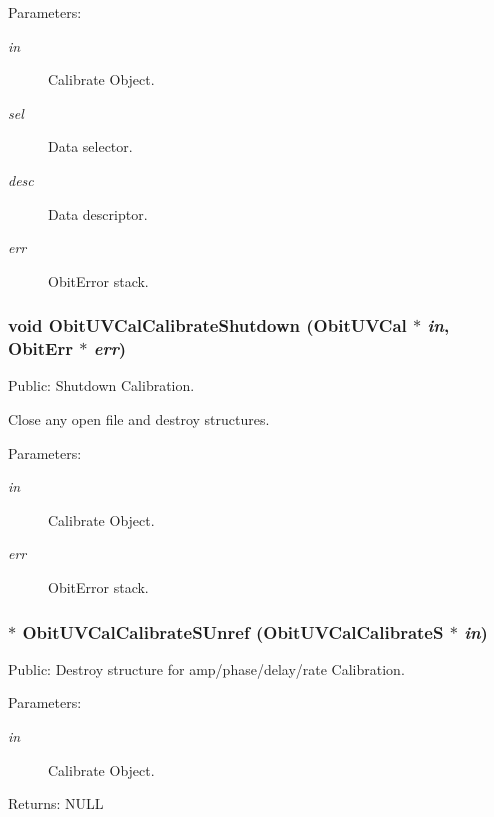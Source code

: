\begin{Desc}
\item[Parameters:]
\begin{description}
\item[{\em in}]Calibrate Object. \item[{\em sel}]Data selector. \item[{\em desc}]Data descriptor. \item[{\em err}]Obit\-Error stack. \end{description}
\end{Desc}
\subsubsection{\setlength{\rightskip}{0pt plus 5cm}void Obit\-UVCal\-Calibrate\-Shutdown ({\bf Obit\-UVCal} $\ast$ {\em in}, {\bf Obit\-Err} $\ast$ {\em err})}\label{ObitUVCalCalibrate_8h_a2}


Public: Shutdown Calibration. 

Close any open file and destroy structures. \begin{Desc}
\item[Parameters:]
\begin{description}
\item[{\em in}]Calibrate Object. \item[{\em err}]Obit\-Error stack. \end{description}
\end{Desc}
\subsubsection{$\ast$ Obit\-UVCal\-Calibrate\-SUnref ({\bf Obit\-UVCal\-Calibrate\-S} $\ast$ {\em in})}\label{ObitUVCalCalibrate_8h_a3}


Public: Destroy structure for amp/phase/delay/rate Calibration. 

\begin{Desc}
\item[Parameters:]
\begin{description}
\item[{\em in}]Calibrate Object. \end{description}
\end{Desc}
\begin{Desc}
\item[Returns:]NULL \end{Desc}
